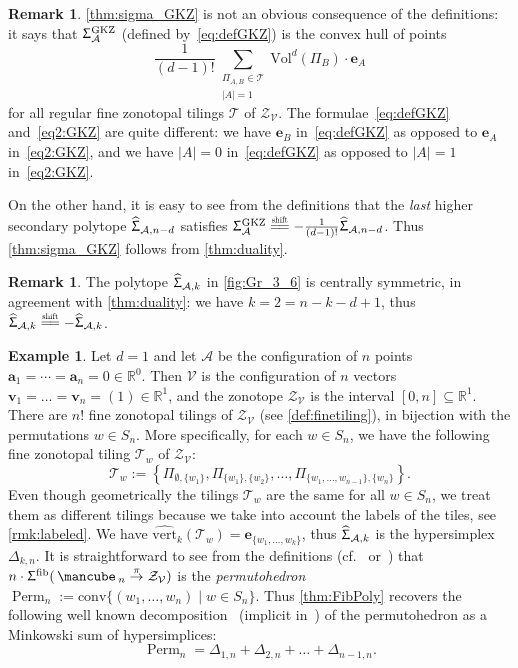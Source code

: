 \documentclass[11pt]{amsart}
\theoremstyle{plain}
\theoremstyle{definition}
\newtheorem{remark}[theorem]{Remark}
\newtheorem{example}[theorem]{Example}
\def\R{\mathbb{R}}
\def\v{{\bm{v}}}
\def\A{\mathcal{A}}
\def\V{\mathcal{V}}
\def\e{{\bm{e}}}
\def\a{{\bm{a}}}
\def\Conv{\mathrm{conv}}
\def\Zon{\mathcal{Z}}
\def\ZV{\Zon_\V}
\def\cube{\mbox{\,\mancube\,}}
\def\Vol{\mathrm{Vol}}
\def\GKZ{{\operatorname{GKZ}}}
\newcommand\wh[1]{\hstretch{2}{\hat{\hstretch{0.5}{#1}}}}
\def\vert{\mathrm{vert}}
\def\vertHSP{\wh\vert}
\def\vertHSP{\widehat{\vert}}
\def\HSP{\widehat\Upsigma}
\def\Sigma{\HSP}
\def\fiber{{\operatorname{fib}}}
\def\FibPoly{\Upsigma^\fiber}
\def\SigmaGKZ{\Upsigma_\A^{\GKZ}}
\def\pito{\overset \pi \to}
\def\VC{\V}
\def\Tcal{\mathcal{T}}
\def\Tiling{\Tcal}
\def\tile{\Pi}
\newcommand\shifteq{\stackrel{\mathclap{\normalfont\mbox{\scalebox{0.6}{shift}}}}{=\joinrel=}}
\newcommand\summa[2]{\sum_{\substack{#1 \\ #2}}}
\def\sumlevel#1{\summa{\tile_{A,B}\in\Tiling}{|A|=#1}}
\def\VolX(#1){\Vol^d(\tile_{#1})}
\def\VolB{\VolX(B)}
\let\subset\subseteq
\begin{document}
\begin{remark}\label{rem:notobvious}
	\cref{thm:sigma_GKZ}	is not an obvious consequence of the definitions: 
	it says that $\SigmaGKZ$ (defined by~\eqref{eq:defGKZ}) 
	is the convex hull of points
\begin{equation}\label{eq2:GKZ}
	\frac1{(d-1)!}\sumlevel{1}
	\VolB \cdot \e_A
\end{equation}
for all regular fine zonotopal tilings $\Tiling$ of $\Zon_\VC$. The formulae~\eqref{eq:defGKZ} 
	and~\eqref{eq2:GKZ} are quite different: we have $\e_B$ in~\eqref{eq:defGKZ} as opposed to $\e_A$ in~\eqref{eq2:GKZ}, and we have $|A|=0$ in~\eqref{eq:defGKZ} as 
	opposed to $|A|=1$ in~\eqref{eq2:GKZ}.

On the other hand, it is easy to see from the definitions that 
the \emph{last} higher secondary polytope $\Sigma_{\A,n-d}$ satisfies $\SigmaGKZ\shifteq -\frac1{(d-1)!}\Sigma_{\A,n-d}$. Thus \cref{thm:sigma_GKZ} 
follows from \cref{thm:duality}.
\end{remark}

\begin{remark}
 The polytope $\Sigma_{\A,k}$ in \cref{fig:Gr_3_6} is centrally symmetric, in agreement with \cref{thm:duality}: we have $k=2=n-k-d+1$, thus $\Sigma_{\A,k}\shifteq -\Sigma_{\A,k}$.
\end{remark}


\begin{example}\label{ex:d1} 
Let $d=1$ and let $\A$ be the configuration of $n$ points
$\a_1=\cdots = \a_n = 0\in\R^0$.
Then $\V$ is the configuration of $n$ vectors
$\v_1 = \dots = \v_n = (1)\in \R^1$, and the zonotope
$\ZV$ is the interval $[0,n] \subset \R^1$.
	There are $n!$ fine zonotopal tilings of $\ZV$
	(see \cref{def:finetiling}), 
in bijection with the permutations $w\in S_n$.  More specifically,
for each $w\in S_n$, we have the following fine zonotopal tiling $\Tiling_w$ of $\ZV$:
\[\Tiling_w := \left\{\tile_{\emptyset, \{w_1\}}, 
\tile_{\{w_1\}, \{w_2\}}, \dots,
\tile_{\{w_1,\dots,w_{n-1}\}, \{w_n\}}\right\}.\]
Even though geometrically the tilings $\Tiling_w$ are the same for all $w\in S_n$, we treat them as different tilings because we take into account the labels of the tiles, see \cref{rmk:labeled}. 
\def\Perm{\operatorname{Perm}}
 We have $\vertHSP_k(\Tiling_w) = \e_{\{w_1,\dots,w_k\}}$, thus $\Sigma_{\A,k}$ is the 
	hypersimplex $\Delta_{k,n}$. It is straightforward to see from the definitions (cf.~\cite[Example~5.4]{BS} or~\cite[Example~9.8]{Ziegler}) that $n\cdot \FibPoly(\cube_n\pito \Zon_\VC)$ is the \emph{permutohedron} $\Perm_n:=\Conv\{(w_1,\dots,w_n)\mid w\in S_n\}$. Thus \cref{thm:FibPoly} recovers the following well known decomposition~\cite[Section~16]{PostnikovPAB} (implicit in~\cite{GS}) 
of the permutohedron as a Minkowski sum of hypersimplices:
\[\Perm_n=\Delta_{1,n}+\Delta_{2,n}+\dots+\Delta_{n-1,n}.\]
\end{example}
\end{document}
